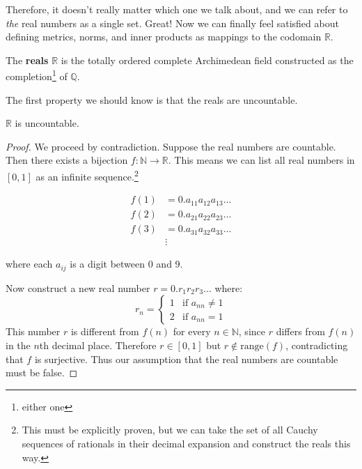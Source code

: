   Therefore, it doesn't really matter which one we talk about, and we can refer to \textit{the} real numbers as a single set. Great! Now we can finally feel satisfied about defining metrics, norms, and inner products as mappings to the codomain $\mathbb{R}$. 

  \begin{definition}
    The \textbf{reals} $\mathbb{R}$ is the totally ordered complete Archimedean field constructed as the completion\footnote{either one} of $\mathbb{Q}$. 
  \end{definition}

  The first property we should know is that the reals are uncountable. 

  \begin{theorem}
    $\mathbb{R}$ is uncountable.
  \end{theorem}
  \begin{proof}
    We proceed by contradiction. Suppose the real numbers are countable. Then there exists a bijection $f: \mathbb{N} \to \mathbb{R}$. This means we can list all real numbers in $[0,1]$ as an infinite sequence.\footnote{This must be explicitly proven, but we can take the set of all Cauchy sequences of rationals in their decimal expansion and construct the reals this way.}
    
    \begin{align*}
      f(1) &= 0.a_{11}a_{12}a_{13}\dots \\
      f(2) &= 0.a_{21}a_{22}a_{23}\dots \\
      f(3) &= 0.a_{31}a_{32}a_{33}\dots \\
      &\vdots
    \end{align*}
    
    where each $a_{ij}$ is a digit between 0 and 9.
    
    Now construct a new real number $r = 0.r_1r_2r_3\dots$ where:
    \begin{equation}
      r_n = \begin{cases}
        1 & \text{if } a_{nn} \neq 1 \\
        2 & \text{if } a_{nn} = 1
      \end{cases}
    \end{equation}
    This number $r$ is different from $f(n)$ for every $n \in \mathbb{N}$, since $r$ differs from $f(n)$ in the $n$th decimal place. Therefore $r \in [0,1]$ but $r \notin \text{range}(f)$, contradicting that $f$ is surjective. Thus our assumption that the real numbers are countable must be false.
  \end{proof}

